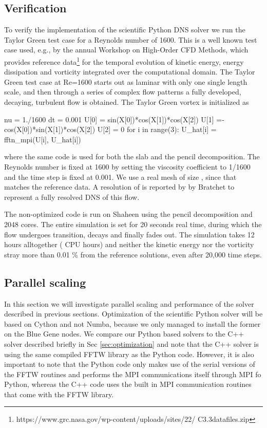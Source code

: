 \documentclass[final,3p,times,twocolumn]{elsarticle}
\begin{document}
\subsection{Verification}
\label{sec:verification}
To verify the implementation of the scientific Python DNS solver we run the 
Taylor Green test case for a Reynolds number of 1600. This is a well known test 
case used, e.g., by the annual Workshop on High-Order CFD Methods, which 
provides reference 
data\footnote{https://www.grc.nasa.gov/wp-content/uploads/sites/22/ 
C3.3datafiles.zip} for the temporal evolution of kinetic energy, energy 
dissipation and vorticity 
integrated over the computational domain. The Taylor Green test case at Re=1600 
starts out as laminar with only one single length scale, and then through a 
series of complex flow patterns a fully developed, decaying, turbulent flow is 
obtained. The Taylor Green vortex is initialized as
\begin{python}
nu = 1./1600
dt = 0.001
U[0] = sin(X[0])*cos(X[1])*cos(X[2])
U[1] =-cos(X[0])*sin(X[1])*cos(X[2])
U[2] = 0
for i in range(3):
    U_hat[i] = fftn_mpi(U[i], U_hat[i])
\end{python}
where the same code is used for both the slab and the pencil decomposition. The Reynolds number is fixed at 1600 by setting the viscosity coefficient to 1/1600 and the time step is fixed at 0.001. We use a real mesh of size , since that matches the reference data. A resolution of  is reported by by Bratchet \cite{brachet1991direct} to represent a fully resolved DNS of this flow.

The non-optimized code is run on Shaheen using the pencil decomposition and 2048 cores. The entire simulation is set for 20 seconds real time, during which the flow undergoes transition, decays and finally fades out. The simulation takes 12 hours alltogether ( CPU hours) and neither the kinetic energy nor the vorticity stray more than 0.01 \% from the reference solutions, even after 20,000 time steps.

\subsection{Parallel scaling}
In this section we will investigate parallel scaling and performance of the 
solver described in previous sections. Optimization of the 
scientific Python solver will be based on Cython and not Numba, because we only 
managed to install the former on the Blue Gene nodes. We compare our Python 
based solvers to the C++ solver described briefly in Sec \ref{sec:optimization} 
and note that the C++ solver is using the same compiled FFTW library as the 
Python code. However, it is also important to note that the Python code only 
makes use of the serial versions of the FFTW routines and performs the MPI 
communications itself through MPI fo Python, whereas the C++ code uses the 
built in MPI communication routines that come with the FFTW library.
\end{document}
